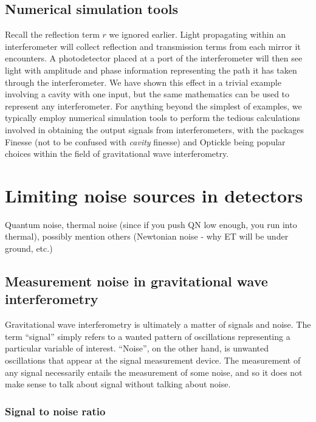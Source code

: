 \subsection{Numerical simulation tools}
Recall the reflection term $r$ we ignored earlier. Light propagating within an interferometer will collect reflection and transmission terms from each mirror it encounters. A photodetector placed at a port of the interferometer will then see light with amplitude and phase information representing the path it has taken through the interferometer. We have shown this effect in a trivial example involving a \FP{} cavity with one input, but the same mathematics can be used to represent any interferometer. For anything beyond the simplest of examples, we typically employ numerical simulation tools to perform the tedious calculations involved in obtaining the output signals from interferometers, with the packages Finesse \cite{Freise2004} (not to be confused with \emph{cavity} finesse) and Optickle \cite{Evans2012} being popular choices within the field of gravitational wave interferometry.

\section{Limiting noise sources in detectors}
Quantum noise, thermal noise (since if you push QN low enough, you run into thermal), possibly mention others (Newtonian noise - why ET will be under ground, etc.)

\subsection{Measurement noise in gravitational wave interferometry}
Gravitational wave interferometry is ultimately a matter of signals and noise. The term ``signal'' simply refers to a wanted pattern of oscillations representing a particular variable of interest. ``Noise'', on the other hand, is unwanted oscillations that appear at the signal measurement device. The measurement of any signal necessarily entails the measurement of some noise, and so it does not make sense to talk about signal without talking about noise.

\subsubsection{\label{sec:snr}Signal to noise ratio}

